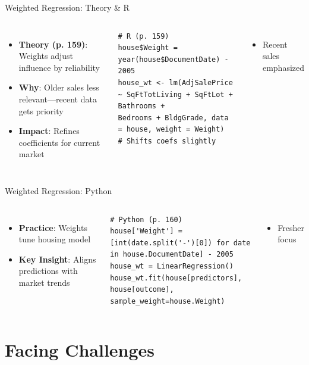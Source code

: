 \documentclass{beamer}
\begin{document}
	\begin{frame}[fragile]{Weighted Regression: Theory \& R}
		\begin{columns}
			\begin{itemize}
				\item \textbf{Theory (p. 159)}: Weights adjust influence by reliability
				\item \textbf{Why}: Older sales less relevant—recent data gets priority
				\item \textbf{Impact}: Refines coefficients for current market
			\end{itemize}
			\begin{lstlisting}
# R (p. 159)
house$Weight = year(house$DocumentDate) - 2005
house_wt <- lm(AdjSalePrice ~ SqFtTotLiving + SqFtLot + Bathrooms +
Bedrooms + BldgGrade, data = house, weight = Weight)
# Shifts coefs slightly
			\end{lstlisting}
			\begin{itemize}
				\item Recent sales emphasized
			\end{itemize}
		\end{columns}
	\end{frame}
	
	\begin{frame}[fragile]{Weighted Regression: Python}
		\lstset{language=Python}
		\begin{columns}
			\column{0.6\textwidth}
			\begin{itemize}
				\item \textbf{Practice}: Weights tune housing model
				\item \textbf{Key Insight}: Aligns predictions with market trends
			\end{itemize}
			\begin{lstlisting}
# Python (p. 160)
house['Weight'] = [int(date.split('-')[0]) for date in house.DocumentDate] - 2005
house_wt = LinearRegression()
house_wt.fit(house[predictors], house[outcome], sample_weight=house.Weight)
			\end{lstlisting}
			\column{0.4\textwidth}
			\begin{itemize}
				\item Fresher focus
			\end{itemize}
		\end{columns}
	\end{frame}
	
	\section{Facing Challenges}
	
\end{document}
